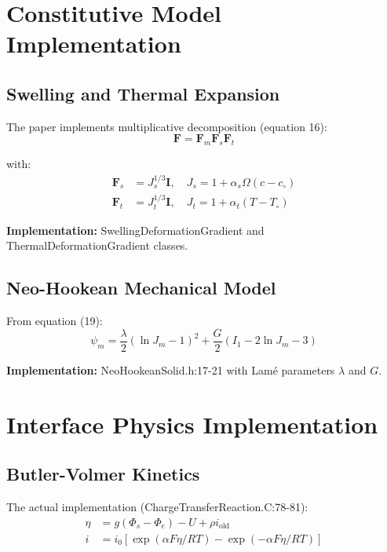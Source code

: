 \documentclass[11pt,a4paper]{article}
\begin{document}
\section{Constitutive Model Implementation}

\subsection{Swelling and Thermal Expansion}

The paper implements multiplicative decomposition (equation 16):
\begin{equation}
\mathbf{F} = \mathbf{F}_m \mathbf{F}_s \mathbf{F}_t
\end{equation}

with:
\begin{align}
\mathbf{F}_s &= J_s^{1/3} \mathbf{I}, \quad J_s = 1 + \alpha_s \Omega(c - c_\circ) \\
\mathbf{F}_t &= J_t^{1/3} \mathbf{I}, \quad J_t = 1 + \alpha_t (T - T_\circ)
\end{align}

\textbf{Implementation:} SwellingDeformationGradient and ThermalDeformationGradient classes.

\subsection{Neo-Hookean Mechanical Model}

From equation (19):
\begin{equation}
\psi_m = \frac{\lambda}{2}(\ln J_m - 1)^2 + \frac{G}{2}(I_1 - 2\ln J_m - 3)
\end{equation}

\textbf{Implementation:} NeoHookeanSolid.h:17-21 with Lamé parameters $\lambda$ and $G$.

\section{Interface Physics Implementation}

\subsection{Butler-Volmer Kinetics}

The actual implementation (ChargeTransferReaction.C:78-81):
\begin{align}
\eta &= g(\Phi_s - \Phi_e) - U + \rho i_{\text{old}} \\
i &= i_0 [\exp(\alpha F \eta / RT) - \exp(-\alpha F \eta / RT)]
\end{align}
\end{document}
